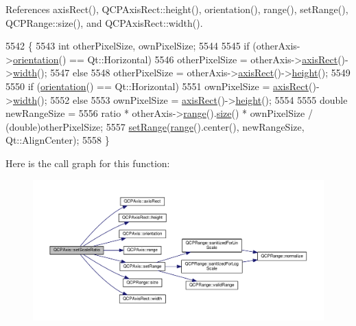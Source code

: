 References axis\+Rect(), Q\+C\+P\+Axis\+Rect\+::height(), orientation(), range(), set\+Range(), Q\+C\+P\+Range\+::size(), and Q\+C\+P\+Axis\+Rect\+::width().


\begin{DoxyCode}
5542                                                                   \{
5543   \textcolor{keywordtype}{int} otherPixelSize, ownPixelSize;
5544 
5545   \textcolor{keywordflow}{if} (otherAxis->\hyperlink{class_q_c_p_axis_a57483f2f60145ddc9e63f3af53959265}{orientation}() == Qt::Horizontal)
5546     otherPixelSize = otherAxis->\hyperlink{class_q_c_p_axis_aada3102af43b029e3879bcbf2bddfabb}{axisRect}()->\hyperlink{class_q_c_p_axis_rect_a45bf5c17f4ca29131b7eb0db06efc259}{width}();
5547   \textcolor{keywordflow}{else}
5548     otherPixelSize = otherAxis->\hyperlink{class_q_c_p_axis_aada3102af43b029e3879bcbf2bddfabb}{axisRect}()->\hyperlink{class_q_c_p_axis_rect_a1c55c4f3bef40cf01b21820316c8469e}{height}();
5549 
5550   \textcolor{keywordflow}{if} (\hyperlink{class_q_c_p_axis_a57483f2f60145ddc9e63f3af53959265}{orientation}() == Qt::Horizontal)
5551     ownPixelSize = \hyperlink{class_q_c_p_axis_aada3102af43b029e3879bcbf2bddfabb}{axisRect}()->\hyperlink{class_q_c_p_axis_rect_a45bf5c17f4ca29131b7eb0db06efc259}{width}();
5552   \textcolor{keywordflow}{else}
5553     ownPixelSize = \hyperlink{class_q_c_p_axis_aada3102af43b029e3879bcbf2bddfabb}{axisRect}()->\hyperlink{class_q_c_p_axis_rect_a1c55c4f3bef40cf01b21820316c8469e}{height}();
5554 
5555   \textcolor{keywordtype}{double} newRangeSize =
5556       ratio * otherAxis->\hyperlink{class_q_c_p_axis_ab1ea79a4f5ea4cf42620f8f51c477ac4}{range}().\hyperlink{class_q_c_p_range_afa57c13049b965edb6fd1c00ac56338a}{size}() * ownPixelSize / (double)otherPixelSize;
5557   \hyperlink{class_q_c_p_axis_aebdfea5d44c3a0ad2b4700cd4d25b641}{setRange}(\hyperlink{class_q_c_p_axis_ab1ea79a4f5ea4cf42620f8f51c477ac4}{range}().center(), newRangeSize, Qt::AlignCenter);
5558 \}
\end{DoxyCode}


Here is the call graph for this function\+:\nopagebreak
\begin{figure}[H]
\begin{center}
\leavevmode
\includegraphics[width=350pt]{class_q_c_p_axis_af4bbd446dcaee5a83ac30ce9bcd6e125_cgraph}
\end{center}
\end{figure}


